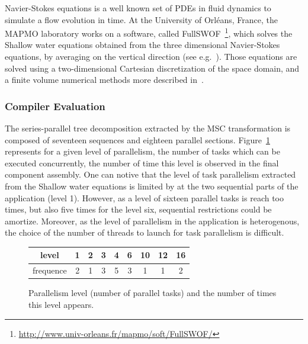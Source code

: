 Navier-Stokes equations is a well known set of PDEs in fluid dynamics to simulate a flow evolution in time. At the University of Orl\'eans, France, the MAPMO laboratory works on a software, called FullSWOF~\footnote{\url{http://www.univ-orleans.fr/mapmo/soft/FullSWOF/}}, which solves the Shallow water equations obtained from the three dimensional Navier-Stokes equations, by averaging on the vertical direction (see e.g.~\cite{Ferrari2004}). Those equations are solved using a two-dimensional Cartesian discretization of the space domain, and a finite volume numerical methods more described in~\cite{HeleneLS13}.

\subsubsection*{Compiler Evaluation}

The series-parallel tree decomposition extracted by the MSC transformation is composed of seventeen sequences and eighteen parallel sections. Figure~\ref{fig:freq} represents for a given level of parallelism, \ie the number of tasks which can be executed concurrently, the number of time this level is observed in the final component assembly. One can notive that the level of task parallelism extracted from the Shallow water equations is limited by at the two sequential parts of the application (level 1). However, as a level of sixteen parallel tasks is reach too times, but also five times for the level six, sequential restrictions could be amortize. Moreover, as the level of parallelism in the application is heterogenous, the choice of the number of threads to launch for task parallelism is difficult.

\begin{figure}[!h]
 \begin{center}
 \begin{tabular}{c|c|c|c|c|c|c|c|c|}
   level & 1 & 2 & 3 & 4 & 6 & 10 & 12 & 16\\
   \hline
   frequence & 2 & 1 & 3 & 5 & 3 & 1 & 1 & 2\\
 \end{tabular}
\caption{Parallelism level (number of parallel tasks) and the number of times this level appears.}
\label{fig:freq}
 \end{center}
\end{figure}

